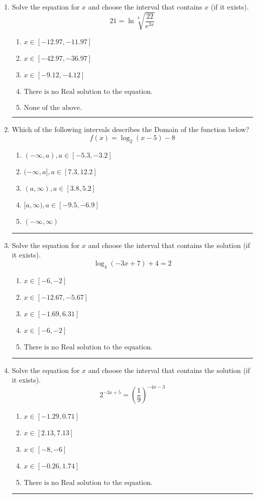 \documentclass[14pt]{extbook}
\newcommand{\litem}[1]{\item#1\hspace*{-1cm}\rule{\textwidth}{0.4pt}}
\begin{document}
\begin{enumerate}
{\begin{enumerate}[label=\Alph*.]
\end{enumerate} }
\litem{
 Solve the equation for $x$ and choose the interval that contains $x$ (if it exists).\[  21 = \ln{\sqrt[6]{\frac{22}{e^{3x}}}} \]\begin{enumerate}[label=\Alph*.]
\item \( x \in [-12.97, -11.97] \)
\item \( x \in [-42.97, -36.97] \)
\item \( x \in [-9.12, -4.12] \)
\item \( \text{There is no Real solution to the equation.} \)
\item \( \text{None of the above.} \)

\end{enumerate} }
\litem{
Which of the following intervals describes the Domain of the function below?\[ f(x) = \log_2{(x-5)}-8 \]\begin{enumerate}[label=\Alph*.]
\item \( (-\infty, a), a \in [-5.3, -3.2] \)
\item \( (-\infty, a], a \in [7.3, 12.2] \)
\item \( (a, \infty), a \in [3.8, 5.2] \)
\item \( [a, \infty), a \in [-9.5, -6.9] \)
\item \( (-\infty, \infty) \)

\end{enumerate} }
\litem{
Solve the equation for $x$ and choose the interval that contains the solution (if it exists).\[ \log_{4}{(-3x+7)}+4 = 2 \]\begin{enumerate}[label=\Alph*.]
\item \( x \in [-6, -2] \)
\item \( x \in [-12.67, -5.67] \)
\item \( x \in [-1.69, 6.31] \)
\item \( x \in [-6, -2] \)
\item \( \text{There is no Real solution to the equation.} \)

\end{enumerate} }
\litem{
Solve the equation for $x$ and choose the interval that contains the solution (if it exists).\[ 2^{-3x+5} = \left(\frac{1}{9}\right)^{-4x-3} \]\begin{enumerate}[label=\Alph*.]
\item \( x \in [-1.29, 0.71] \)
\item \( x \in [2.13, 7.13] \)
\item \( x \in [-8, -6] \)
\item \( x \in [-0.26, 1.74] \)
\item \( \text{There is no Real solution to the equation.} \)


\end{enumerate}}
\end{enumerate}
\end{document}
